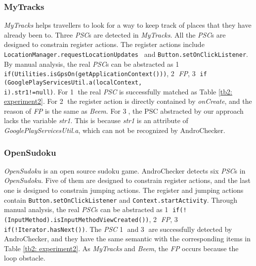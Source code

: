 \subsubsection{MyTracks}
\textit{MyTracks} helps travellers to look for a way to keep track of places that they have already been to. Three \textit{PSC}s are detected in \textit{MyTracks}.  All the \textit{PSC}s are designed to constrain register actions. The register actions include \texttt{LocationManager.requestLocationUpdates } and \texttt{Button.setOnClickListener}. By manual analysis, the real \textit{PSC}s can be abstracted as  \textcircled{1} \texttt{if(Utilities.isGpsOn(getApplicationContext()))}, \textcircled{2} \textit{FP}, \textcircled{3} \texttt{if (GooglePlayServicesUtil.a(localContext,}\\
 \texttt{i).str1!=null)}. For  \textcircled{1} the real \textit{PSC} is successfully matched as Table \ref{tb2: experiment2}. For \textcircled{2} the register action is directly contained by \textit{onCreate}, and the reason of \textit{FP} is the same as \textit{Beem}. For \textcircled{3}, the PSC abstracted by our approach lacks the variable \textit{str1}. This is because \textit{str1} is an attribute of \textit{GooglePlayServicesUtil.a},  which can not be recognized by AndroChecker.

\subsubsection{OpenSudoku}
\textit{OpenSudoku} is an open source sudoku game. AndroChecker detects six \textit{PSC}s in \textit{OpenSudoku}. Five of them are designed to constrain register actions, and the last one is designed to constrain jumping actions. The register and jumping actions contain \texttt{Button.setOnClickListener} and \texttt{Context.startActivity}. Through manual analysis, the real \textit{PSC}s can be abstracted as  \textcircled{1} \texttt{if(!(InputMethod).isInputMethodViewCreated())}, \textcircled{2} \textit{FP}, \textcircled{3} \texttt{if(!Iterator.hasNext())}.
The \textit{PSC}  \textcircled{1} and \textcircled{3} are successfully detected by AndroChecker, and they have the same semantic with the corresponding items in Table \ref{tb2: experiment2}. As \textit{MyTracks} and \textit{Beem}, the \textit{FP} occurs because the loop obstacle.





